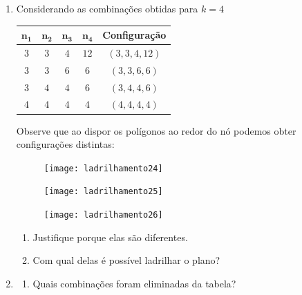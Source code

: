 \begin{enumerate}
	\item Considerando as combinações obtidas para $k=4$
	\begin{table}[H]
	\centering
	\begin{tabu} to \textwidth{|c|c|c|c|c|}
	\hline
	\thead
	$\bm{n_1}$ & $\bm{n_2}$ & $\bm{n_3}$ & $\bm{n_4}$ & Configuração \\
	\hline
	$3$ & $3$ & $4$ & $12$ & $(3,3,4,12)$ \\
	\hline
	$3$ & $3$ & $6$ & $6$ & $(3,3,6,6)$ \\
	\hline
	$3$ & $4$ & $4$ & $6$ & $(3,4,4,6)$ \\
	\hline
	$4$ & $4$ & $4$ & $4$ & $(4,4,4,4)$ \\
	\hline
	\end{tabu}
	\end{table}

	Observe que ao dispor os polígonos ao redor do nó podemos obter configurações distintas:
	
	\begin{figure}[H]
	\centering
	\texttt{[image: ladrilhamento24]}

	\end{figure}	
	\begin{figure}[H]
	\centering
	\texttt{[image: ladrilhamento25]}

	\end{figure}	
	\begin{figure}[H]
	\centering
	\texttt{[image: ladrilhamento26]}

	\end{figure}	

	\begin{enumerate}
		\item Justifique porque elas são diferentes.
		\item Com qual delas é possível ladrilhar o plano?
	\end{enumerate}
	\item \begin{enumerate}
			
		\item Quais combinações foram eliminadas da tabela?


\end{enumerate}
\end{enumerate}
